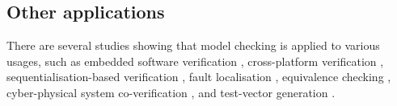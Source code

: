 \subsection{Other applications}
There are several studies showing that model checking is applied to various usages, such as embedded software verification \cite{Cordeiro:2009:SBM:1747491.1747515, BK11}, cross-platform verification \cite{0fbeb641779543c98fb1d6ff2180664c}, sequentialisation-based verification \cite{6693139}, fault localisation \cite{Griesmayer:2007:AFL:1247747.1248089}, equivalence checking \cite{Lee2011}, cyber-physical system co-verification \cite{6649878}, and test-vector generation \cite{Angeletti2009}.










